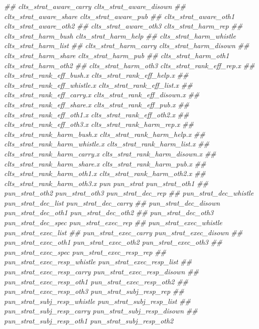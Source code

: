 \documentclass[
]{article}
\newenvironment{Shaded}{\begin{snugshade}}{\end{snugshade}}
\newcommand{\CommentTok}[1]{\textcolor[rgb]{0.56,0.35,0.01}{\textit{#1}}}
\begin{document}
\begin{Shaded}
\begin{Highlighting}[]
\CommentTok{##      clts_strat_aware_carry clts_strat_aware_disown}
\CommentTok{##      clts_strat_aware_share clts_strat_aware_pub}
\CommentTok{##      clts_strat_aware_oth1 clts_strat_aware_oth2}
\CommentTok{##      clts_strat_aware_oth3 clts_strat_harm_rep}
\CommentTok{##      clts_strat_harm_bush clts_strat_harm_help}
\CommentTok{##      clts_strat_harm_whistle clts_strat_harm_list}
\CommentTok{##      clts_strat_harm_carry clts_strat_harm_disown}
\CommentTok{##      clts_strat_harm_share clts_strat_harm_pub}
\CommentTok{##      clts_strat_harm_oth1 clts_strat_harm_oth2}
\CommentTok{##      clts_strat_harm_oth3 clts_strat_rank_eff_rep.x}
\CommentTok{##      clts_strat_rank_eff_bush.x clts_strat_rank_eff_help.x}
\CommentTok{##      clts_strat_rank_eff_whistle.x clts_strat_rank_eff_list.x}
\CommentTok{##      clts_strat_rank_eff_carry.x clts_strat_rank_eff_disown.x}
\CommentTok{##      clts_strat_rank_eff_share.x clts_strat_rank_eff_pub.x}
\CommentTok{##      clts_strat_rank_eff_oth1.x clts_strat_rank_eff_oth2.x}
\CommentTok{##      clts_strat_rank_eff_oth3.x clts_strat_rank_harm_rep.x}
\CommentTok{##      clts_strat_rank_harm_bush.x clts_strat_rank_harm_help.x}
\CommentTok{##      clts_strat_rank_harm_whistle.x clts_strat_rank_harm_list.x}
\CommentTok{##      clts_strat_rank_harm_carry.x clts_strat_rank_harm_disown.x}
\CommentTok{##      clts_strat_rank_harm_share.x clts_strat_rank_harm_pub.x}
\CommentTok{##      clts_strat_rank_harm_oth1.x clts_strat_rank_harm_oth2.x}
\CommentTok{##      clts_strat_rank_harm_oth3.x pun pun_strat pun_strat_oth1}
\CommentTok{##      pun_strat_oth2 pun_strat_oth3 pun_strat_dec_rep}
\CommentTok{##      pun_strat_dec_whistle pun_strat_dec_list pun_strat_dec_carry}
\CommentTok{##      pun_strat_dec_disown pun_strat_dec_oth1 pun_strat_dec_oth2}
\CommentTok{##      pun_strat_dec_oth3 pun_strat_dec_spec pun_strat_exec_rep}
\CommentTok{##      pun_strat_exec_whistle pun_strat_exec_list}
\CommentTok{##      pun_strat_exec_carry pun_strat_exec_disown}
\CommentTok{##      pun_strat_exec_oth1 pun_strat_exec_oth2 pun_strat_exec_oth3}
\CommentTok{##      pun_strat_exec_spec pun_strat_exec_resp_rep}
\CommentTok{##      pun_strat_exec_resp_whistle pun_strat_exec_resp_list}
\CommentTok{##      pun_strat_exec_resp_carry pun_strat_exec_resp_disown}
\CommentTok{##      pun_strat_exec_resp_oth1 pun_strat_exec_resp_oth2}
\CommentTok{##      pun_strat_exec_resp_oth3 pun_strat_subj_resp_rep}
\CommentTok{##      pun_strat_subj_resp_whistle pun_strat_subj_resp_list}
\CommentTok{##      pun_strat_subj_resp_carry pun_strat_subj_resp_disown}
\CommentTok{##      pun_strat_subj_resp_oth1 pun_strat_subj_resp_oth2}

\end{Highlighting}
\end{Shaded}
\end{document}
